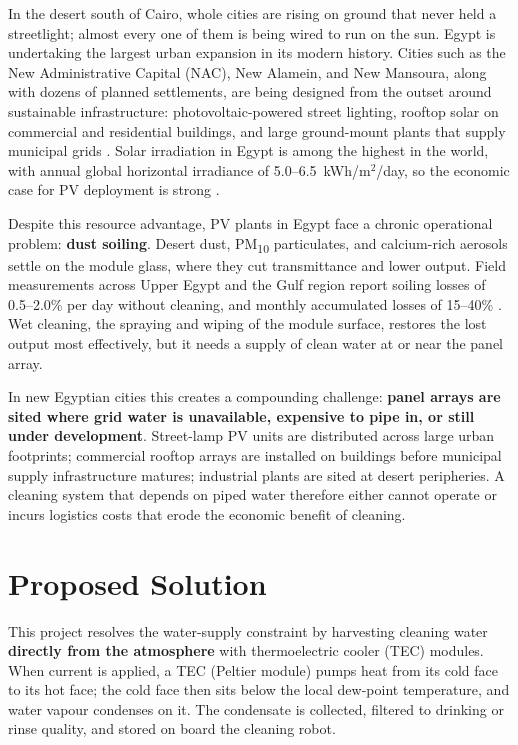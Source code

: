 \documentclass[12pt,a4paper]{report}   %
\begin{document}
In the desert south of Cairo, whole cities are rising on ground that never held a streetlight;
almost every one of them is being wired to run on the sun. Egypt is undertaking the largest
urban expansion in its modern history. Cities such as the New
Administrative Capital (NAC), New Alamein, and New Mansoura, along with dozens of planned
settlements, are being designed from the outset around sustainable infrastructure: photovoltaic-powered
street lighting, rooftop solar on commercial and residential buildings, and large ground-mount
plants that supply municipal grids \cite{egypt2030vision}. Solar irradiation in Egypt is among the
highest in the world, with annual global horizontal irradiance of 5.0--6.5~kWh/m$^2$/day, so the
economic case for PV deployment is strong \cite{irena2023egypt,globalsolaratlas}.

Despite this resource advantage, PV plants in Egypt face a chronic operational
problem: \textbf{dust soiling}. Desert dust, PM\textsubscript{10} particulates, and calcium-rich
aerosols settle on the module glass, where they cut transmittance and lower output. Field
measurements across Upper Egypt and the Gulf region report soiling losses of
0.5--2.0\% per day without cleaning, and monthly accumulated losses of 15--40\%
\cite{kazem2023soiling,sarver2013pvsoiling,caron2013soiling}. Wet cleaning, the spraying and wiping
of the module surface, restores the lost output most effectively, but it needs a supply of clean
water at or near the panel array.

In new Egyptian cities this creates a compounding challenge: \textbf{panel arrays are sited where
grid water is unavailable, expensive to pipe in, or still under development}. Street-lamp PV units
are distributed across large urban footprints; commercial rooftop arrays are installed on buildings
before municipal supply infrastructure matures; industrial plants are sited at desert peripheries.
A cleaning system that depends on piped water therefore either cannot operate or incurs logistics
costs that erode the economic benefit of cleaning.

\section{Proposed Solution}

This project resolves the water-supply constraint by harvesting cleaning water
\textbf{directly from the atmosphere} with thermoelectric cooler (TEC) modules. When current is
applied, a TEC (Peltier module) pumps heat from its cold face to its hot face; the cold face then
sits below the local dew-point temperature, and water vapour condenses on it. The
condensate is collected, filtered to drinking or rinse quality, and stored on board the cleaning
robot.
\end{document}
